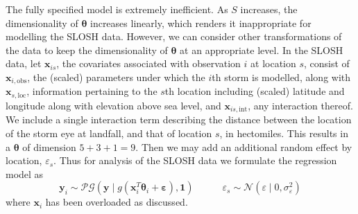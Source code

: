 The fully specified model is extremely inefficient. As $S$ increases, the dimensionality of
    $\bm{\theta}$ increases linearly, which renders it inappropriate for modelling the SLOSH data.  
    However, we can consider other transformations of the data to keep the dimensionality of 
    $\bm{\theta}$ at an appropriate level. In the SLOSH data, let $\bm{x}_{is}$, the covariates 
    associated with observation $i$ at location $s$, consist of $\bm{x}_{i,\text{obs}}$, the 
    (scaled) parameters under which the $i$th storm is modelled, along with $\bm{x}_{s,\text{loc}}$, 
    information pertaining to the $s$th location including (scaled) latitude and longitude along with
    elevation above sea level, and $\bm{x}_{is,\text{int}}$, any interaction thereof.
    We include a single interaction term describing the distance between the location of the storm eye 
    at landfall, and that of location $s$, in hectomiles. This results in a $\bm{\theta}$ of dimension 
    $5 + 3 + 1 = 9$.  Then we may add an additional random effect by location, $\varepsilon_s$.  Thus for 
    analysis of the SLOSH data we formulate the regression model as
    \begin{equation}
        \label{eqn:regressionmodelredux}
        \bm{y}_i \sim 
            \mathcal{PG}\left(\bm{y}\mid g(\bm{x}_i^T\bm{\theta}_i + \bm{\varepsilon}), \bm{1}\right)
            \;\hspace{1cm}\;
            \varepsilon_s \sim \mathcal{N}(\varepsilon \mid 0, \sigma_{\varepsilon}^2)
    \end{equation}
    where $\bm{x}_i$ has been overloaded as discussed.
    
